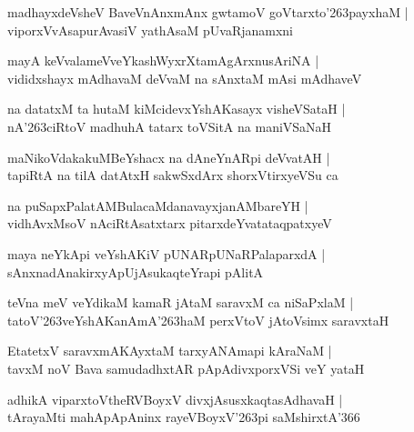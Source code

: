 \documentclass[twoside,12pt,openright]{book}
\def\S{\char'263}
\newcounter{shloka}[chapter]
\begin{document}
\begin{shloka}%
madhayxdeVsheV BaveVnAnxmAnx gwtamoV goVtarxto\S payxhaM |\\
viporxVvAsapurAvasiV yathAsaM pUvaRjanamxni
\end{shloka}

\begin{shloka}%
mayA keVvalameVveYkashWyxrXtamAgArxnusAriNA |\\
vididxshayx mAdhavaM deVvaM na sAnxtaM mAsi mAdhaveV
\end{shloka}

\begin{shloka}%
na datatxM ta hutaM kiMcidevxYshAKasayx visheVSataH |\\
nA\S ciRtoV madhuhA tatarx toVSitA na maniVSaNaH 
\end{shloka}

\begin{shloka}%
maNikoVdakakuMBeYshacx na dAneYnARpi deVvatAH |\\
tapiRtA na tilA datAtxH sakwSxdArx shorxVtirxyeVSu ca 
\end{shloka}

\begin{shloka}%
na puSapxPalatAMBulacaMdanavayxjanAMbareYH |\\
vidhAvxMsoV nAciRtAsatxtarx pitarxdeYvatataqpatxyeV 
\end{shloka}

\begin{shloka}%
maya neYkApi veYshAKiV pUNARpUNaRPalaparxdA |\\
sAnxnadAnakirxyApUjAsukaqteYrapi pAlitA 
\end{shloka}

\begin{shloka}%
teVna meV veYdikaM kamaR jAtaM saravxM ca niSaPxlaM |\\
tatoV\S veYshAKanAmA\S haM perxVtoV jAtoVsimx saravxtaH 
\end{shloka}

\begin{shloka}%
EtatetxV saravxmAKAyxtaM tarxyANAmapi kAraNaM |\\
tavxM noV Bava samudadhxtAR pApAdivxporxVSi veY yataH 
\end{shloka}

\begin{shloka}%
adhikA viparxtoVtheRVBoyxV divxjAsusxkaqtasAdhavaH |\\
tArayaMti mahApApAninx rayeVBoyxV\S pi saMshirxtA\char'366
\end{shloka}
\end{document}
